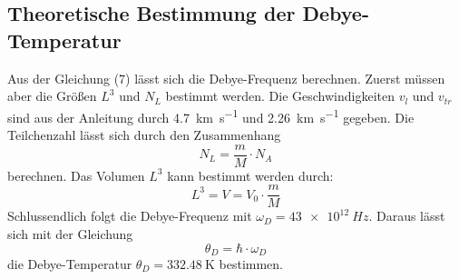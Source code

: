 \subsection{Theoretische Bestimmung der Debye-Temperatur}

Aus der Gleichung (7) lässt sich die Debye-Frequenz berechnen.
Zuerst müssen aber die Größen $L^3$ und $N_L$ bestimmt werden.
Die Geschwindigkeiten $v_l$ und $v_{tr}$ sind aus der Anleitung \cite{V47} durch \SI{4.7}{\kilo\meter\second^{-1}}
und \SI{2.26}{\kilo\meter\second^{-1}} gegeben.
Die Teilchenzahl lässt sich durch den Zusammenhang
\begin{equation}
  N_L = \frac{m}{M} \cdot N_A
\end{equation}
berechnen.
Das Volumen $L^3$ kann bestimmt werden durch:
\begin{equation}
  L^3 = V = V_0 \cdot \frac{m}{M}
\end{equation}
Schlussendlich folgt die Debye-Frequenz mit $\omega_D = \SI{43e12}{Hz}$.
Daraus lässt sich mit der Gleichung
\begin{equation}
  \theta_D = \hbar \cdot \omega_D
\end{equation}
die Debye-Temperatur $\theta_D = \SI{332.48}{\kelvin}$ bestimmen.

